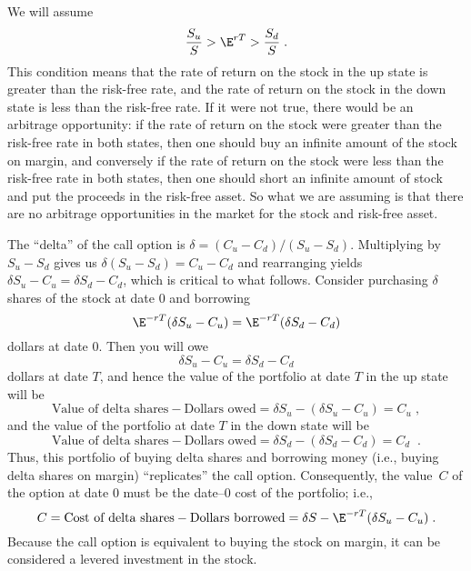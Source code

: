 We will assume
\begin{equation}\label{binomialnoarbitrage}
\frac{S_u}{S} > \E^{rT} > \frac{S_d}{S}\;.
\end{equation}
This condition means that the rate of return on the stock in the up state is greater than the risk-free rate, and the rate of return on the stock in the down state is less than the risk-free rate.  If it were not true, there would be an arbitrage opportunity:  if the rate of return on the stock were greater than the risk-free rate in both states, then one should buy an infinite amount of the stock on margin, and conversely if the rate of return on the stock were less than the risk-free rate in both states, then one should short an infinite amount of stock and put the proceeds in the risk-free asset.  So what we are assuming is that there are no arbitrage opportunities in the market for the stock and risk-free asset.

The ``delta'' of the call option is $\delta = (C_u-C_d)/(S_u-S_d)$.   Multiplying by $S_u-S_d$ gives us $\delta(S_u-S_d) = C_u-C_d$ and rearranging yields  $\delta S_u - C_u = \delta S_d-C_d$, which is critical to what follows.  Consider purchasing $\delta$ shares of the stock at date 0 and borrowing
$$\E^{-rT}(\delta S_u-C_u) = \E^{-rT}(\delta S_d-C_d)$$
dollars at date 0.  Then you will owe 
$$\delta S_u-C_u = \delta S_d-C_d$$
dollars at date $T$, and hence the value of the portfolio at date $T$ in the up state will be
$$\text{Value of delta shares} - \text{Dollars owed} = \delta S_u - (\delta S_u-C_u) = C_u\; ,$$
and the value of the portfolio at date $T$ in the down state will be
$$\text{Value of delta shares} - \text{Dollars owed} = \delta S_d - (\delta S_d-C_d) = C_d\;\;.$$
Thus, this portfolio of buying delta shares and  borrowing money (i.e., buying delta shares on margin) ``replicates'' the call option.    Consequently, the value~$C$ of the option at date 0 must be the date--0 cost of the portfolio; i.e.,
\begin{equation}\label{C0}
C = \text{Cost of delta shares} - \text{Dollars borrowed} = \delta S - \E^{-rT}(\delta S_u-C_u)\;.
\end{equation}
Because the call option is equivalent to buying the stock on margin, it can be considered a levered investment in the stock. 

